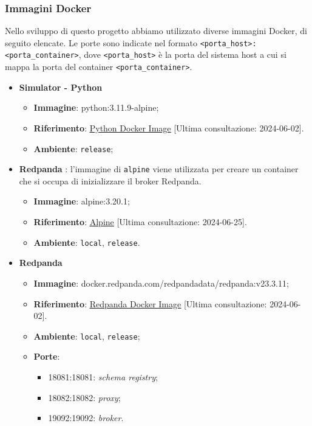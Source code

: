 \subsubsection{Immagini Docker}
Nello sviluppo di questo progetto abbiamo utilizzato diverse immagini Docker, di seguito elencate.
Le porte sono indicate nel formato \texttt{<porta\_host>:<porta\_container>}, dove \texttt{<porta\_host>} è la porta del sistema host a cui si mappa la porta del container \texttt{<porta\_container>}.
\begin{itemize}
	\item \textbf{Simulator - Python}
	      \begin{itemize}
		      \item \textbf{Immagine}: python:3.11.9-alpine;
		      \item \textbf{Riferimento}: \underline{\href{https://hub.docker.com/_/python}{Python Docker Image}} [Ultima consultazione: 2024-06-02].
		      \item \textbf{Ambiente}: \texttt{release};
	      \end{itemize}

	\item \textbf{Redpanda }:
	      l'immagine di \texttt{alpine} viene utilizzata per creare un container che si occupa di inizializzare il broker Redpanda.
	      \begin{itemize}
		      \item \textbf{Immagine}: alpine:3.20.1;
		      \item \textbf{Riferimento}: \underline{\href{https://hub.docker.com/_/alpine}{Alpine}} [Ultima consultazione: 2024-06-25].
		      \item \textbf{Ambiente}: \texttt{local}, \texttt{release}.
	      \end{itemize}

	\item \textbf{Redpanda}
	      \begin{itemize}
		      \item \textbf{Immagine}: docker.redpanda.com/redpandadata/redpanda:v23.3.11;
		      \item \textbf{Riferimento}: \underline{\href{https://hub.docker.com/r/redpandadata/redpanda}{Redpanda Docker Image}} [Ultima consultazione: 2024-06-02].
		      \item \textbf{Ambiente}: \texttt{local}, \texttt{release};
		      \item \textbf{Porte}:
		            \begin{itemize}
			            \item 18081:18081: \textit{schema registry};
			            \item 18082:18082: \textit{proxy};
			            \item 19092:19092: \textit{broker}.
		            \end{itemize}
	      \end{itemize}


\end{itemize}
